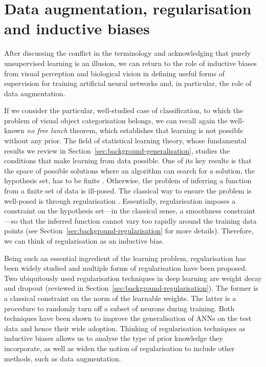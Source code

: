 {\section{Data augmentation, regularisation and inductive biases}
After discussing the conflict in the terminology and acknowledging that purely unsupervised learning is an illusion, we can return to the role of inductive biases from visual perception and biological vision in defining useful forms of supervision for training artificial neural networks and, in particular, the role of data augmentation. 

If we consider the particular, well-studied case of classification, to which the problem of visual object categorisation belongs, we can recall again the well-known \textit{no free lunch} theorem, which establishes that learning is not possible without any prior. The field of statistical learning theory, whose fundamental results we review in Section~\ref{sec:background-generalisation}, studies the conditions that make learning from data possible. One of its key results is that the space of possible solutions where an algorithm can search for a solution, the hypothesis set, has to be finite \citep{vapnik1971vc}. Otherwise, the problem of inferring a function from a finite set of data is ill-posed. The classical way to ensure the problem is well-posed is through regularisation \citep{phillips1962regularisation, tikhonov1963regularisation, ivanov1976regularisation}. Essentially, regularisation imposes a constraint on the hypothesis set---in the classical sense, a smoothness constraint---so that the inferred function cannot vary too rapidly around the training data points (see Section~\ref{sec:background-regularisation} for more details). Therefore, we can think of regularisation as an inductive bias. 

Being such an essential ingredient of the learning problem, regularisation has been widely studied and multiple forms of regularisation have been proposed. Two ubiquitously used regularisation techniques in deep learning are weight decay and dropout (reviewed in Section~\ref{sec:background-regularisation}). The former is a classical constraint on the norm of the learnable weights. The latter is a procedure to randomly turn off a subset of neurons during training. Both techniques have been shown to improve the generalisation of ANNs on the test data and hence their wide adoption. Thinking of regularisation techniques as inductive biases allows us to analyse the type of prior knowledge they incorporate, as well as widen the notion of regularisation to include other methods, such as data augmentation.

}
